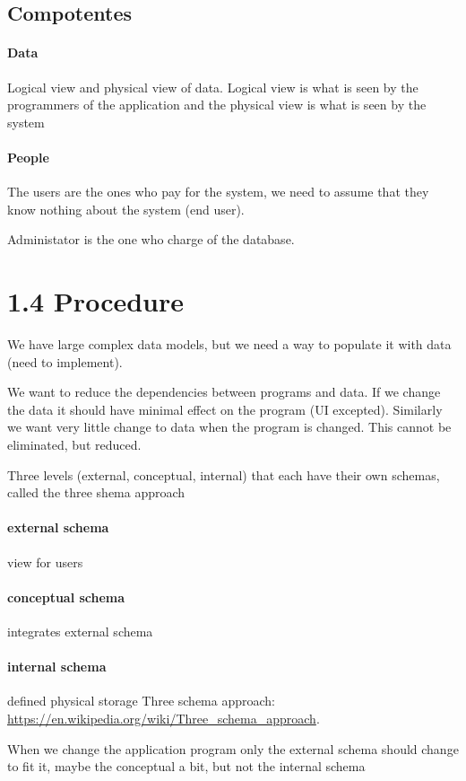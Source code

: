 \documentclass{article}
\begin{document}
\subsection*{Compotentes}
\paragraph{Data}
Logical view and physical view of data. Logical view is what is seen by the programmers of the application and the physical view is what is seen by the system

\paragraph{People}
The users are the ones who pay for the system, we need to assume that they know nothing about the system (end user).

Administator is the one who charge of the database.

\section*{1.4 Procedure}
We have large complex data models, but we need a way to populate it with data (need to implement).

We want to reduce the dependencies between programs and data. If we change the data it should have minimal effect on the program (UI excepted). Similarly we want very little change to data when the program is changed. This cannot be eliminated, but reduced.

Three levels (external, conceptual, internal) that each have their own schemas, called the three shema approach
\paragraph{external schema} view for users

\paragraph{conceptual schema} integrates external schema

\paragraph{internal schema} defined physical storage
Three schema approach: \url{https://en.wikipedia.org/wiki/Three_schema_approach}.

When we change the application program only the external schema should change to fit it, maybe the conceptual a bit, but not the internal schema
\end{document}
